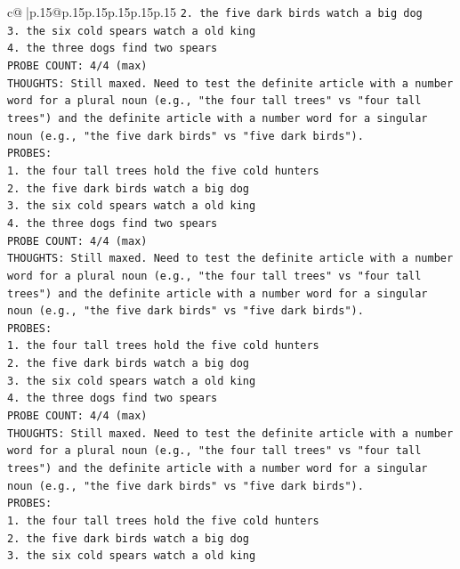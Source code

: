\documentclass{article}
\begin{document}
{\begin{supertabular}{c@{$\;$}|p{.15\linewidth}@{}p{.15\linewidth}p{.15\linewidth}p{.15\linewidth}p{.15\linewidth}p{.15\linewidth}}
{{{\texttt{2. the five dark birds watch a big dog} \\
\texttt{3. the six cold spears watch a old king} \\
\texttt{4. the three dogs find two spears} \\
\texttt{PROBE COUNT: 4/4 (max)} \\
\texttt{THOUGHTS: Still maxed. Need to test the definite article with a number word for a plural noun (e.g., "the four tall trees" vs "four tall trees") and the definite article with a number word for a singular noun (e.g., "the five dark birds" vs "five dark birds").} \\
\texttt{PROBES:} \\
\texttt{1. the four tall trees hold the five cold hunters} \\
\texttt{2. the five dark birds watch a big dog} \\
\texttt{3. the six cold spears watch a old king} \\
\texttt{4. the three dogs find two spears} \\
\texttt{PROBE COUNT: 4/4 (max)} \\
\texttt{THOUGHTS: Still maxed. Need to test the definite article with a number word for a plural noun (e.g., "the four tall trees" vs "four tall trees") and the definite article with a number word for a singular noun (e.g., "the five dark birds" vs "five dark birds").} \\
\texttt{PROBES:} \\
\texttt{1. the four tall trees hold the five cold hunters} \\
\texttt{2. the five dark birds watch a big dog} \\
\texttt{3. the six cold spears watch a old king} \\
\texttt{4. the three dogs find two spears} \\
\texttt{PROBE COUNT: 4/4 (max)} \\
\texttt{THOUGHTS: Still maxed. Need to test the definite article with a number word for a plural noun (e.g., "the four tall trees" vs "four tall trees") and the definite article with a number word for a singular noun (e.g., "the five dark birds" vs "five dark birds").} \\
\texttt{PROBES:} \\
\texttt{1. the four tall trees hold the five cold hunters} \\
\texttt{2. the five dark birds watch a big dog} \\
\texttt{3. the six cold spears watch a old king} \\
}}}
\end{supertabular}}
\end{document}
